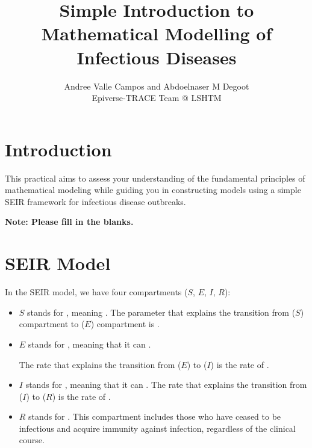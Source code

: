 \documentclass{article}
\author{Andree Valle Campos and Abdoelnaser M Degoot \\ Epiverse-TRACE Team @ LSHTM }
\title{Simple Introduction to Mathematical Modelling of Infectious Diseases}
\begin{document}
\maketitle

\section{Introduction}
This practical aims to assess your understanding of the fundamental 
principles of mathematical modeling while guiding you in constructing models using 
a simple SEIR framework for infectious disease outbreaks. 
 
 \textbf{Note: Please fill in the blanks.}

\section{SEIR Model}

 In the  SEIR model, we have four compartments (\( S \), \( E \), \( I \), \( R \)):

\begin{itemize}
    \item \( S \) stands for \underline{\hspace{2cm}}, meaning \underline{\hspace{6cm}}.
The parameter that explains the transition from  (\( S \)) compartment 
to  (\( E \)) compartment is \underline{\hspace{6cm}}.
\item \(E\) stands for \underline{\hspace{2cm}}, meaning that it can 
    \underline{\hspace{4cm}}. 
    
    The rate that explains the transition from  (\( E \)) to  (\( I \)) is the rate of \underline{\hspace{1cm}}.
    
    \item \( I \) stands for \underline{\hspace{2cm}}, meaning that it can 
    \underline{\hspace{3cm}}.
    The rate that explains the transition from  (\( I \)) to  (\( R \)) is the rate of \underline{\hspace{6cm}}.
    
    \item \( R \) stands for \underline{\hspace{3cm}}. This compartment includes those who have ceased to be infectious and acquire immunity against infection, regardless of the clinical course.
\end{itemize}
\end{document}
